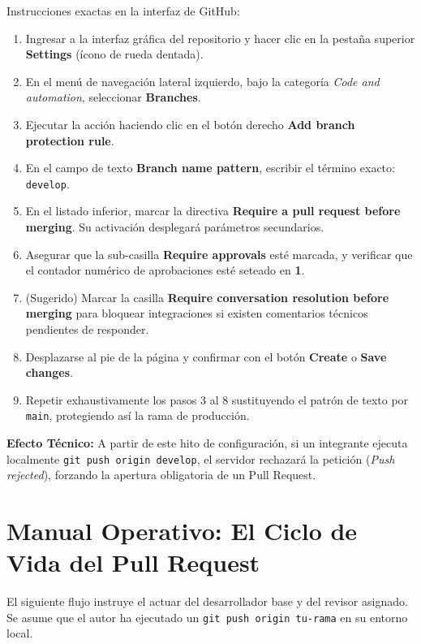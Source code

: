 \documentclass[12pt, a4paper]{article}
\begin{document}
Instrucciones exactas en la interfaz de GitHub:
\begin{enumerate}
    \item Ingresar a la interfaz gráfica del repositorio y hacer clic en la pestaña superior \textbf{Settings} (ícono de rueda dentada).
    \item En el menú de navegación lateral izquierdo, bajo la categoría \textit{Code and automation}, seleccionar \textbf{Branches}.
    \item Ejecutar la acción haciendo clic en el botón derecho \textbf{Add branch protection rule}.
    \item En el campo de texto \textbf{Branch name pattern}, escribir el término exacto: \texttt{develop}.
    \item En el listado inferior, marcar la directiva \textbf{Require a pull request before merging}. Su activación desplegará parámetros secundarios.
    \item Asegurar que la sub-casilla \textbf{Require approvals} esté marcada, y verificar que el contador numérico de aprobaciones esté seteado en \textbf{1}.
    \item (Sugerido) Marcar la casilla \textbf{Require conversation resolution before merging} para bloquear integraciones si existen comentarios técnicos pendientes de responder.
    \item Desplazarse al pie de la página y confirmar con el botón \textbf{Create} o \textbf{Save changes}.
    \item Repetir exhaustivamente los pasos 3 al 8 sustituyendo el patrón de texto por \texttt{main}, protegiendo así la rama de producción.
\end{enumerate}

\textbf{Efecto Técnico:} A partir de este hito de configuración, si un integrante ejecuta localmente \texttt{git push origin develop}, el servidor rechazará la petición (\textit{Push rejected}), forzando la apertura obligatoria de un Pull Request.

\section{Manual Operativo: El Ciclo de Vida del Pull Request}
El siguiente flujo instruye el actuar del desarrollador base y del revisor asignado. Se asume que el autor ha ejecutado un \texttt{git push origin tu-rama} en su entorno local.
\end{document}
